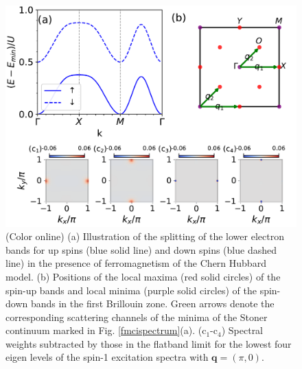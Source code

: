 \documentclass[amsmath,superscriptaddress,showpacs,aps,prb,twocolumn]{revtex4-1}
\begin{document}
\begin{figure}
\includegraphics[width=\columnwidth]{bspicture}
\caption{(Color online) (a) Illustration of the splitting of the lower electron bands for up spins (blue solid line) and down spins (blue dashed line) in the presence of ferromagnetism of the Chern Hubbard model. (b) Positions of the local maxima (red solid circles) of the spin-up bands and local minima (purple solid circles) of the spin-down bands in the first Brillouin zone. Green arrows denote the corresponding scattering channels of the minima of the Stoner continuum marked in Fig. \ref{fmcispectrum}(a). (c$_1$-c$_4$) Spectral weights subtracted by those in the flatband limit for the lowest four eigen levels of the spin-1 excitation spectra with $\mathbf{q}=(\pi,0)$.}
\label{bspicture}
\end{figure}
\end{document}
